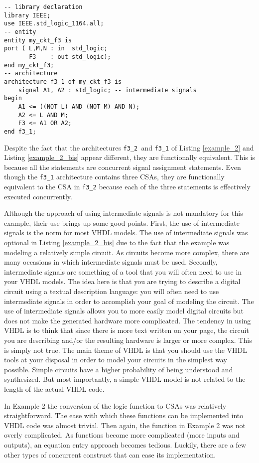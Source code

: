 \begin{lstlisting}[float, label=example_2_bis, caption=Alternative solution of Example 2.]
-- library declaration
library IEEE;
use IEEE.std_logic_1164.all;
-- entity
entity my_ckt_f3 is
port ( L,M,N : in  std_logic;
       F3    : out std_logic);
end my_ckt_f3;
-- architecture
architecture f3_1 of my_ckt_f3 is
	signal A1, A2 : std_logic; -- intermediate signals
begin
	A1 <= ((NOT L) AND (NOT M) AND N);
	A2 <= L AND M;
	F3 <= A1 OR A2;
end f3_1;
\end{lstlisting}

Despite the fact that the architectures \texttt{f3\_2 }and \texttt{f3\_1} of Listing \ref{example_2} and Listing \ref{example_2_bis} appear different, they are functionally equivalent. This is because all the statements are concurrent signal assignment statements. Even though the \texttt{f3\_1} architecture contains three CSAs, they are functionally equivalent to the CSA in \texttt{f3\_2} because each of the three statements is effectively executed concurrently.

Although the approach of using intermediate signals is not mandatory for this example, their use brings up some good points. First, the use of intermediate signals is the norm for most VHDL models. The use of intermediate signals was optional in Listing \ref{example_2_bis} due to the fact that the example was modeling a relatively simple circuit. As circuits become more complex, there are many occasions in which intermediate signals must be used. Secondly, intermediate signals are something of a tool that you will often need to use in your VHDL models. The idea here is that you are trying to describe a digital circuit using a textual description language: you will often need to use intermediate signals in order to accomplish your goal of modeling the circuit. The use of intermediate signals allows you to more easily model digital circuits but does not make the generated hardware more complicated. The tendency in using VHDL is to think that since there is more text written on your page, the circuit you are describing and/or the resulting hardware is larger or more complex. This is simply not true. The main theme of VHDL is that you should use the VHDL tools at your disposal in order to model your circuits in the simplest way possible. Simple circuits have a higher probability of being understood and synthesized. But most importantly, a simple VHDL model is not related to the length of the actual VHDL code.

In Example 2 the conversion of the logic function to CSAs was relatively straightforward. The ease with which these functions can be implemented into VHDL code was almost trivial. Then again, the function in Example 2 was not overly complicated. As functions become more complicated (more inputs and outputs), an equation entry approach becomes tedious. Luckily, there are a few other types of concurrent construct that can ease its implementation.

